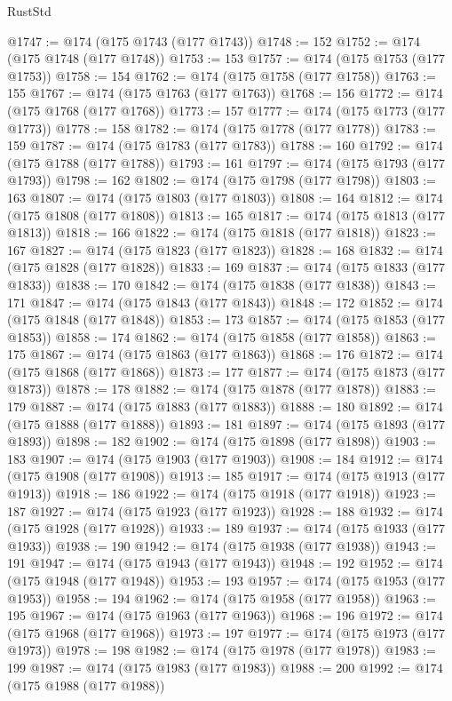 \begin{lexlean}{RustStd}
\begin{coremodule}
@1747 := @174 (@175 @1743 (@177 @1743))
@1748 := 152
@1752 := @174 (@175 @1748 (@177 @1748))
@1753 := 153
@1757 := @174 (@175 @1753 (@177 @1753))
@1758 := 154
@1762 := @174 (@175 @1758 (@177 @1758))
@1763 := 155
@1767 := @174 (@175 @1763 (@177 @1763))
@1768 := 156
@1772 := @174 (@175 @1768 (@177 @1768))
@1773 := 157
@1777 := @174 (@175 @1773 (@177 @1773))
@1778 := 158
@1782 := @174 (@175 @1778 (@177 @1778))
@1783 := 159
@1787 := @174 (@175 @1783 (@177 @1783))
@1788 := 160
@1792 := @174 (@175 @1788 (@177 @1788))
@1793 := 161
@1797 := @174 (@175 @1793 (@177 @1793))
@1798 := 162
@1802 := @174 (@175 @1798 (@177 @1798))
@1803 := 163
@1807 := @174 (@175 @1803 (@177 @1803))
@1808 := 164
@1812 := @174 (@175 @1808 (@177 @1808))
@1813 := 165
@1817 := @174 (@175 @1813 (@177 @1813))
@1818 := 166
@1822 := @174 (@175 @1818 (@177 @1818))
@1823 := 167
@1827 := @174 (@175 @1823 (@177 @1823))
@1828 := 168
@1832 := @174 (@175 @1828 (@177 @1828))
@1833 := 169
@1837 := @174 (@175 @1833 (@177 @1833))
@1838 := 170
@1842 := @174 (@175 @1838 (@177 @1838))
@1843 := 171
@1847 := @174 (@175 @1843 (@177 @1843))
@1848 := 172
@1852 := @174 (@175 @1848 (@177 @1848))
@1853 := 173
@1857 := @174 (@175 @1853 (@177 @1853))
@1858 := 174
@1862 := @174 (@175 @1858 (@177 @1858))
@1863 := 175
@1867 := @174 (@175 @1863 (@177 @1863))
@1868 := 176
@1872 := @174 (@175 @1868 (@177 @1868))
@1873 := 177
@1877 := @174 (@175 @1873 (@177 @1873))
@1878 := 178
@1882 := @174 (@175 @1878 (@177 @1878))
@1883 := 179
@1887 := @174 (@175 @1883 (@177 @1883))
@1888 := 180
@1892 := @174 (@175 @1888 (@177 @1888))
@1893 := 181
@1897 := @174 (@175 @1893 (@177 @1893))
@1898 := 182
@1902 := @174 (@175 @1898 (@177 @1898))
@1903 := 183
@1907 := @174 (@175 @1903 (@177 @1903))
@1908 := 184
@1912 := @174 (@175 @1908 (@177 @1908))
@1913 := 185
@1917 := @174 (@175 @1913 (@177 @1913))
@1918 := 186
@1922 := @174 (@175 @1918 (@177 @1918))
@1923 := 187
@1927 := @174 (@175 @1923 (@177 @1923))
@1928 := 188
@1932 := @174 (@175 @1928 (@177 @1928))
@1933 := 189
@1937 := @174 (@175 @1933 (@177 @1933))
@1938 := 190
@1942 := @174 (@175 @1938 (@177 @1938))
@1943 := 191
@1947 := @174 (@175 @1943 (@177 @1943))
@1948 := 192
@1952 := @174 (@175 @1948 (@177 @1948))
@1953 := 193
@1957 := @174 (@175 @1953 (@177 @1953))
@1958 := 194
@1962 := @174 (@175 @1958 (@177 @1958))
@1963 := 195
@1967 := @174 (@175 @1963 (@177 @1963))
@1968 := 196
@1972 := @174 (@175 @1968 (@177 @1968))
@1973 := 197
@1977 := @174 (@175 @1973 (@177 @1973))
@1978 := 198
@1982 := @174 (@175 @1978 (@177 @1978))
@1983 := 199
@1987 := @174 (@175 @1983 (@177 @1983))
@1988 := 200
@1992 := @174 (@175 @1988 (@177 @1988))

\end{coremodule}
\end{lexlean}

